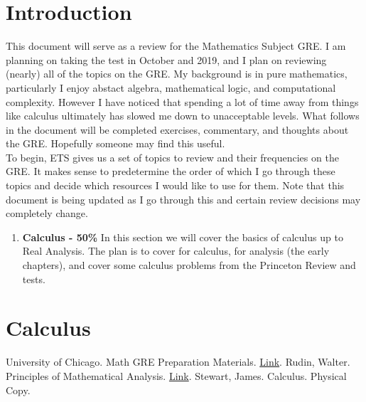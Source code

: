 
\def\name{Daniel Tobias}
\def\assignment{Mathematics GRE Review}
\usepackage{hyperref}

\section{Introduction}
This document will serve as a review for the Mathematics Subject GRE. I am planning on taking the test in October and 2019, and I plan on reviewing (nearly) all of the topics on the GRE. My background is in pure mathematics, particularly I enjoy abstact algebra, mathematical logic, and computational complexity. However I have noticed that spending a lot of time away from things like calculus ultimately has slowed me down to unacceptable levels. What follows in the document will be completed exercises, commentary, and thoughts about the GRE. Hopefully someone may find this useful.\\

To begin, ETS gives us a set of topics to review and their frequencies on the GRE. It makes sense to predetermine the order of which I go through these topics and decide which resources I would like to use for them. Note that this document is being updated as I go through this and certain review decisions may completely change.

\begin{enumerate}
	\item \textbf{Calculus - 50\%} In this section we will cover the basics of calculus up to Real Analysis. The plan is to cover \cite{Stewart} for calculus, \cite{Rudin} for analysis (the early chapters), and cover some calculus problems from the Princeton Review and \cite{UC} tests.
\end{enumerate}

\section{Calculus}

\begin{thebibliography}{9}
	University of Chicago. Math GRE Preparation Materials. \href{https://math.uchicago.edu/~min/GRE/}{Link}.
	Rudin, Walter. Principles of Mathematical Analysis. \href{https://notendur.hi.is/vae11/\%C3\%9Eekking/principles_of_mathematical_analysis_walter_rudin.pdf}{Link}.
	Stewart, James. Calculus. Physical Copy.
\end{thebibliography}


